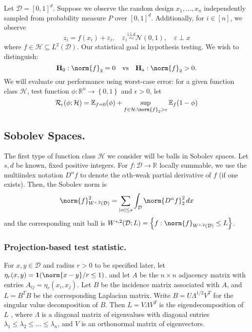 \documentclass{article}
\newcommand{\Reals}{\mathbb{R}}
\newcommand{\abs}[1]{\left \lvert #1 \right \rvert}
\newcommand{\set}[1]{\left\{#1\right\}}
\newcommand{\1}{\mathbf{1}}
\newcommand{\D}{\mathcal{D}}
\newcommand{\Ebb}{\mathbb{E}}
\theoremstyle{alden}
\theoremstyle{aldenthm}
\theoremstyle{definition}
\theoremstyle{remark}
\begin{document}
Let $\mathcal{D} = [0,1]^d$. Suppose we observe the random design $x_1,\ldots,x_n$ independently sampled from probability measure $P$ over $[0,1]^d$. Additionally, for $i \in [n]$, we observe
\begin{equation*}
z_i = f(x_i) + \varepsilon_i, \quad \varepsilon_i \overset{\textrm{i.i.d}}{\sim} \mathcal{N}(0,1), \quad \varepsilon \perp x
\end{equation*}
where $f \in \mathcal{H} \subseteq L^2(\mathcal{D})$. Our statistical goal is hypothesis testing. We wish to distinguish:
\begin{equation*}
\mathbf{H}_0: \norm{f}_2 = 0 \quad \textrm{vs} \quad \mathbf{H}_{\textrm{a}}: \norm{f}_2 > 0. 
\end{equation*}
We will evaluate our performance using worst-case error: for a given function class $\mathcal{H}$, test function $\phi: \Reals^n \to \set{0,1}$ and $\epsilon> 0$, let
\begin{equation*}
\mathcal{R}_{\epsilon}(\phi; \mathcal{H}) = \Ebb_{f = 0}(\phi) + \sup_{f \in \mathcal{H}: \norm{f}_2 > \epsilon} \Ebb_f(1 - \phi)
\end{equation*}

\subsection{Sobolev Spaces.}

The first type of function class $\mathcal{H}$ we consider will be balls in Sobolev spaces. Let $s,d$ be known, fixed positive integers. For $f: \mathcal{D} \to \Reals$ locally summable, we use the multiindex notation $D^{\alpha}f$ to denote the $\alpha$th-weak partial derivative of $f$ (if one exists). Then, the Sobolev norm is 
\begin{equation*}
\norm{f}_{W^{s,2}(\D)}^2 = \sum_{\abs{\alpha} \leq s} \int_{\mathcal{D}} \norm{D^{\alpha}f}_2^2 \,dx
\end{equation*}
and the corresponding unit ball is $W^{s,2}(\D; L) = \set{f: \norm{f}_{W^{s,2}(\mathcal{D})} \leq L}$. 

\subsubsection{Projection-based test statistic.}

For $x,y \in \mathcal{D}$ and radius $r > 0$ to be specified later, let $\eta_r(x,y) = \mathbf{1}(\norm{x - y}/ r \leq 1)$. and let $A$ be the $n \times n$ adjacency matrix with entries $A_{ij} = \eta_r(x_i,x_j)$. Let $B$ be the incidence matrix associated with $A$, and $L = B^TB$ be the corresponding Laplacian matrix. Write $B = U \Lambda^{1/2}V^T$ for the singular value decomposition of $B$. Then $L = V \Lambda V^T$ is the eigendecomposition of $L$ , where $\Lambda$ is a diagonal matrix of eigenvalues with diagonal entries $\lambda_1 \leq \lambda_2 \leq \ldots \leq \lambda_n$, and $V$ is an orthonormal matrix of eigenvectors. 
\end{document}
